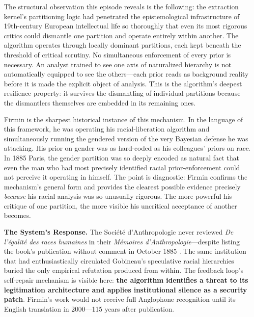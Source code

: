 The structural observation this episode reveals is the following: the extraction kernel's partitioning logic had penetrated the epistemological infrastructure of 19th-century European intellectual life so thoroughly that even its most rigorous critics could dismantle one partition and operate entirely within another. The algorithm operates through locally dominant partitions, each kept beneath the threshold of critical scrutiny. No simultaneous enforcement of every prior is necessary. An analyst trained to see one axis of naturalized hierarchy is not automatically equipped to see the others---each prior reads as background reality before it is made the explicit object of analysis. This is the algorithm's deepest resilience property: it survives the dismantling of individual partitions because the dismantlers themselves are embedded in its remaining ones.

Firmin is the sharpest historical instance of this mechanism. In the language of this framework, he was operating his racial-liberation algorithm and simultaneously running the gendered version of the very Bayesian defense he was attacking. His prior on gender was as hard-coded as his colleagues' priors on race. In 1885 Paris, the gender partition was so deeply encoded as natural fact that even the man who had most precisely identified racial prior-enforcement could not perceive it operating in himself. The point is diagnostic: Firmin confirms the mechanism's general form and provides the clearest possible evidence precisely \textit{because} his racial analysis was so unusually rigorous. The more powerful his critique of one partition, the more visible his uncritical acceptance of another becomes.

\textbf{The System's Response.} The Société d'Anthropologie never reviewed \textit{De l'égalité des races humaines} in their \textit{Mémoires d'Anthropologie}---despite listing the book's publication without comment in October 1885 \cite{drouinhans}. The same institution that had enthusiastically circulated Gobineau's speculative racial hierarchies buried the only empirical refutation produced from within. The feedback loop's self-repair mechanism is visible here: \textbf{the algorithm identifies a threat to its legitimation architecture and applies institutional silence as a security patch}. Firmin's work would not receive full Anglophone recognition until its English translation in 2000---115 years after publication.

